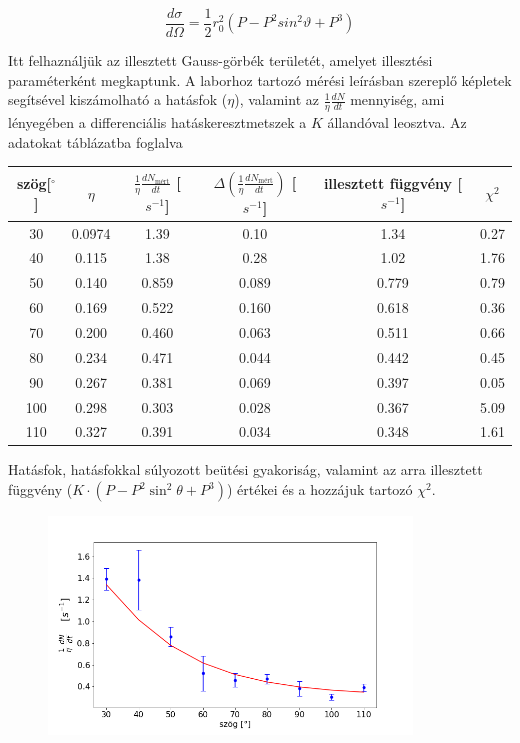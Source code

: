 \documentclass[a4paper,12pt]{article}
\begin{document}
\begin{equation*}
	\frac{d\sigma}{d\Omega} = \frac{1}{2}r_{0}^{2}(P - P^{2}sin^{2}\vartheta + P^{3})
\end{equation*}

\par Itt felhaználjük az illesztett Gauss-görbék területét, amelyet illesztési paraméterként megkaptunk. A laborhoz tartozó mérési leírásban szereplő képletek segítsével kiszámolható a hatásfok ($\eta$), valamint az $\frac{1}{\eta}\frac{dN}{dt}$ mennyiség, ami lényegében a differenciális hatáskeresztmetszek a $K$ állandóval leosztva. Az adatokat táblázatba foglalva

\begin{table}[h]
\begin{center}
\begin{tabular}{|c|c|c|c|c|c|}
\hline
szög[$^{\circ}$] &  $\eta$ & $\frac{1}{\eta}\frac{dN_{\text{mért}}}{dt}$ [$s^{-1}$] & $\Delta\left(\frac{
1}{\eta}\frac{dN_{\text{mért}}}{dt}\right)$ [$s^{-1}$] & illesztett függvény [$s^{-1}$]& $\chi^{2}$ \\
\hline
30 & 0.0974 & 1.39 & 0.10 & 1.34 & 0.27 \\
\hline
40 & 0.115 & 1.38 & 0.28 & 1.02 & 1.76 \\
\hline
50 & 0.140 & 0.859 & 0.089 & 0.779 & 0.79 \\
\hline
60 & 0.169 & 0.522 & 0.160 & 0.618 & 0.36 \\
\hline
70 & 0.200 & 0.460 & 0.063 & 0.511 & 0.66 \\
\hline
80 & 0.234 & 0.471 & 0.044 & 0.442 & 0.45 \\
\hline
90 & 0.267 & 0.381 & 0.069 & 0.397 & 0.05 \\
\hline
100 & 0.298 & 0.303 & 0.028 & 0.367 & 5.09 \\
\hline
110 & 0.327 & 0.391 & 0.034 & 0.348 & 1.61 \\
\hline
\end{tabular}
\end{center}
\end{table}

\par Hatásfok, hatásfokkal súlyozott beütési gyakoriság, valamint az arra illesztett függvény ($K\cdot (P-P^2\sin^2{\theta}+P^3)$) értékei és a hozzájuk tartozó $\chi^2$.

\newpage

\begin{figure}
\centering
\includegraphics[width=0.86\textwidth]{../notebook/klein-nishina.png}
\end{figure}
\end{document}

